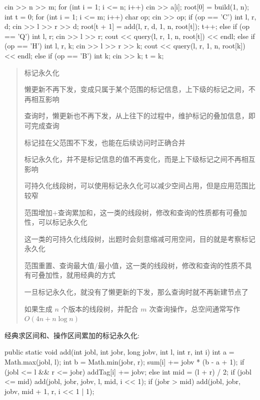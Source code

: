 \documentclass[UTF8,a4paper,11pt]{ctexart}
\newcommand{\topic}[1]{%
  \par\needspace{3\baselineskip}\vspace{0.45em}%
  \noindent{\bfseries\color{Primary}#1}\par\vspace{0.12em}%
}
\begin{document}
\begin{CodeBlock}
cin >> n >> m;
for (int i = 1; i <= n; i++)
    cin >> a[i];
root[0] = build(1, n);
int t = 0;
for (int i = 1; i <= m; i++) {
    char op;
    cin >> op;
    if (op == 'C') {
        int l, r, d;
        cin >> l >> r >> d;
        root[t + 1] = add(l, r, d, 1, n, root[t]);
        t++;
    } else if (op == 'Q') {
        int l, r;
        cin >> l >> r;
        cout << query(l, r, 1, n, root[t]) << endl;
    } else if (op == 'H') {
        int l, r, k;
        cin >> l >> r >> k;
        cout << query(l, r, 1, n, root[k]) << endl;
    } else if (op == 'B') {
        int k;
        cin >> k;
        t = k;
    }
}
\end{CodeBlock}

\topic{标记永久化}

\begin{quote}
标记永久化\par
懒更新不再下发，变成只属于某个范围的标记信息，上下级的标记之间，不再相互影响\par
查询时，懒更新也不再下发，从上往下的过程中，维护标记的叠加信息，即可完成查询\par
标记挂在父范围不下发，也能在后续访问时正确合并\par
标记永久化，并不是标记信息的值不再变化，而是上下级标记之间不再相互影响\par
可持久化线段树，可以使用标记永久化可以减少空间占用，但是应用范围比较窄\par
范围增加+查询累加和，这一类的线段树，修改和查询的性质都有可叠加性，可以标记永久化\par
这一类的可持久化线段树，出题时会刻意缩减可用空间，目的就是考察标记永久化\par
范围重置、查询最大值/最小值，这一类的线段树，修改和查询的性质不具有可叠加性，就用经典的方式\par
一旦标记永久化，就没有了懒更新的下发，那么查询时就不再新建节点了\par
如果生成 $n$ 个版本的线段树，并配合 $m$ 次查询操作，总空间通常写作 $O(4n+n\log n)$\par
\end{quote}

经典求区间和、操作区间累加的标记永久化:

\begin{CodeBlock}
public static void add(int jobl, int jobr, long jobv, int l, int r, int i) {
    int a = Math.max(jobl, l);
    int b = Math.min(jobr, r);
    sum[i] += jobv * (b - a + 1);
    if (jobl <= l && r <= jobr) {
        addTag[i] += jobv;
    } else {
        int mid = (l + r) / 2;
        if (jobl <= mid)
            add(jobl, jobr, jobv, l, mid, i << 1);
        if (jobr > mid)
            add(jobl, jobr, jobv, mid + 1, r, i << 1 | 1);
    }
}
\end{CodeBlock}
\end{document}
